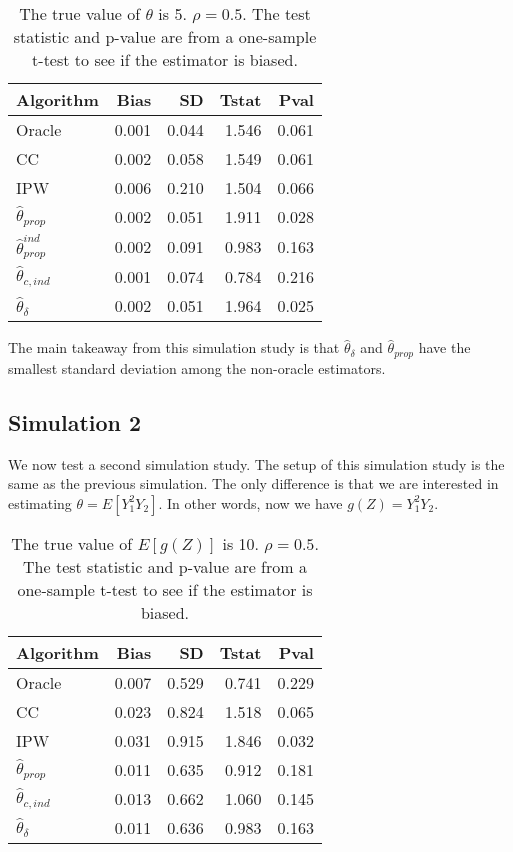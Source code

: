 \documentclass[12pt]{article}
\begin{document}
\begin{table}[ht!]
\caption{The true value of $\theta$ is 5. $\rho = 0.5$. The test statistic and 
p-value are from a one-sample t-test to see if the estimator is biased.}
\centering
\begin{tabular}[t]{lrrrr}
\toprule
Algorithm & Bias & SD & Tstat & Pval\\
\midrule
Oracle & 0.001 & 0.044 & 1.546 & 0.061\\
CC & 0.002 & 0.058 & 1.549 & 0.061\\
IPW & 0.006 & 0.210 & 1.504 & 0.066\\
$\hat \theta_{prop}$ & 0.002 & 0.051 & 1.911 & 0.028\\
$\hat \theta_{prop}^{ind}$ & 0.002 & 0.091 & 0.983 & 0.163\\
$\hat \theta_{c, ind}$ & 0.001 & 0.074 & 0.784 & 0.216\\
$\hat \theta_{\delta}$ & 0.002 & 0.051 & 1.964 & 0.025\\
\bottomrule
\end{tabular}
\end{table}

The main takeaway from this simulation study is that $\hat \theta_\delta$
and $\hat\theta_{prop}$ have the smallest standard deviation among the 
non-oracle estimators.

\subsection*{Simulation 2}
We now test a second simulation study. The setup of this simulation study 
is the same as the previous simulation. The only difference is that we 
are interested in estimating $\theta = E[Y_1^2 Y_2]$. In other words, now 
we have $g(Z) = Y_1^2 Y_2$.

\begin{table}[ht!]
  \caption{The true value of $E[g(Z)]$ is 10. $\rho = 0.5$. The test statistic and 
p-value are from a one-sample t-test to see if the estimator is biased.}
\centering
\begin{tabular}[t]{lrrrr}
\toprule
Algorithm & Bias & SD & Tstat & Pval\\
\midrule
Oracle & 0.007 & 0.529 & 0.741 & 0.229\\
CC & 0.023 & 0.824 & 1.518 & 0.065\\
IPW & 0.031 & 0.915 & 1.846 & 0.032\\
$\hat \theta_{prop}$ & 0.011 & 0.635 & 0.912 & 0.181\\
$\hat \theta_{c, ind}$ & 0.013 & 0.662 & 1.060 & 0.145\\
$\hat \theta_{\delta}$ & 0.011 & 0.636 & 0.983 & 0.163\\
\bottomrule
\end{tabular}
\end{table}
\end{document}
